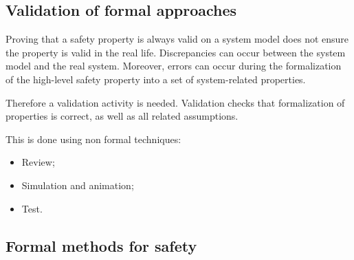 \subsection{Validation of formal approaches}

Proving that a safety property is always valid on a system model does
not ensure the property is valid in the real life. Discrepancies can
occur between the system model and the real system. Moreover, errors
can occur during the formalization of the high-level safety property
into a set of system-related properties.

Therefore a validation activity is needed. Validation checks that
formalization of properties is correct, as well as all related
assumptions.

This is done using non formal techniques:
\begin{itemize}
\item Review;
\item Simulation and animation;
\item Test.
\end{itemize}

\subsection{Formal methods for safety}

\begin{comment}
proof of safety requirements, static analysis, safety analysis, traceability,...
\end{comment}




